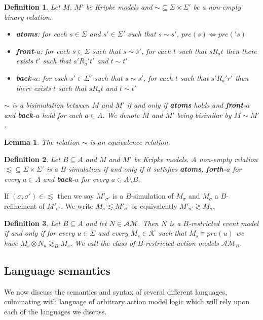 \documentclass[12pt, a4paper, titlepage]{scrartcl}
\newtheorem{defn}{Definition}[section]
\newtheorem{lemma}{Lemma}[section]
\numberwithin{equation}{section}
\newcommand{\kripkeClass}{\mathcal{K}}
\newcommand{\eventClass}{\mathcal{AM}}
\begin{document}
\begin{defn} \label{bisim}
	Let $M$, $M'$ be Kripke models and $\sim \subseteq \Sigma \times \Sigma'$ be a non-empty binary
	relation.
	\begin{itemize}
		\item {\bf atoms}: for each $s \in \Sigma$ and $s' \in \Sigma'$ such that $s \sim s'$, $pre(s)
		\iff pre('s)$
		\item {\bf front-$a$}: for each $s \in \Sigma$ such that $s \sim s'$, for each $t$ such that
		$s R_a t$ then there exists $t'$ such that $s' R_a' t'$ and $t \sim t'$
		\item {\bf back-$a$}: for each $s' \in \Sigma'$ such that $s \sim s'$, for each $t$ such that
		$s' R_a' r'$ then there exists $t$ such that $s R_a t$ and $t \sim t'$
	\end{itemize}
	$\sim$ is a bisimulation between $M$ and $M'$ if and only if {\bf atoms} holds and {\bf front-$a$}
	and {\bf back-$a$} hold for each $a \in A$.
	We denote $M$ and $M'$ being bisimilar by $M \sim M'$.
\end{defn}

\begin{lemma} \label{bisimEquivalence}
	The relation $\sim$ is an equivalence relation.
\end{lemma}

\begin{defn} \label{refinement}
Let $B \subseteq A$ and $M$ and $M'$ be Kripke models. A non-empty relation $\lesssim \subseteq \Sigma
\times \Sigma'$ is a $B$-simulation if and only if it satisfies {\bf atoms}, {\bf forth-$a$} for
every $a \in A$ and {\bf back-$a$} for every $a \in A \setminus B$.
\end{defn}
If $(\sigma, \sigma') \in \lesssim$ then we say $M'_{\sigma'}$ is a $B$-simulation of $M_\sigma$ and
$M_\sigma$ a $B$-refinement of $M'_{\sigma'}$.
We write $M_{\sigma} \lesssim M'_{\sigma'}$ or equivalently $M'_{\sigma'} \gtrsim M_{\sigma}$.

\begin{defn} \label{brestrict}
Let $B \subseteq A$ and let $N \in \eventClass$. Then $N$ is a $B$-restricted event model if and
only if for every $u \in \Sigma$ and every $M_s \in \kripkeClass$ such that $M_s \models pre(u)$ we
have $M_s \otimes N_u \gtrsim_B M_s$.
We call the class of $B$-restricted action models $\mathcal{AM}_B$.
\end{defn}

\subsection{Language semantics}
We now discuss the semantics and syntax of several different languages, culminating with language of
arbitrary action model logic which will rely upon each of the languages we discuss.
\end{document}
